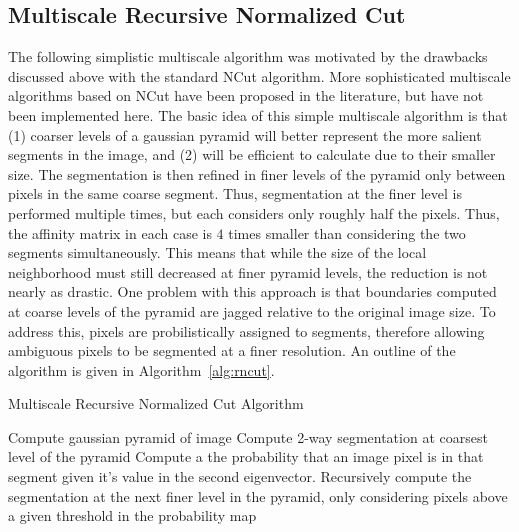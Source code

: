 \documentclass{article}
\begin{document}
\subsection{Multiscale Recursive Normalized Cut}
The following simplistic multiscale algorithm was motivated by the drawbacks discussed above
with the standard NCut algorithm.  More sophisticated multiscale algorithms based on NCut have 
been proposed in the literature, but have not been implemented here\cite{cour}\cite{sharon}\cite{yu}.
The basic idea of this simple multiscale algorithm is that (1) coarser levels of a gaussian 
pyramid will better represent the more salient segments in the image, and (2) will 
be efficient to calculate due to their smaller size.  The segmentation is then refined in
finer levels of the pyramid only between pixels in the same coarse segment.  Thus, segmentation
at the finer level is performed multiple times, but each considers only roughly half the pixels.  
Thus, the affinity matrix in each case is $4$ times smaller than considering the two segments 
simultaneously. This means that while the size of the local neighborhood must still decreased at finer
pyramid levels, the reduction is not nearly as drastic.  
One problem with this approach is that boundaries computed at coarse levels of the pyramid
are jagged relative to the original image size.  To address this, pixels are probilistically
assigned to segments, therefore allowing ambiguous pixels to be segmented at a finer resolution.
An outline of the algorithm is given in Algorithm~\ref{alg:rncut}.
\begin{algorithm}[htb]
	\caption{Multiscale Recursive Normalized Cut Algorithm}
	\label{alg:rncut}
	\begin{algorithmic}[1]
		\STATE Compute gaussian pyramid of image
		\STATE Compute 2-way segmentation at coarsest level of the pyramid
		\STATE Compute a the probability that an image pixel is in that 
		segment given it's value in the second eigenvector.
		\STATE Recursively compute the segmentation at the next finer level
		in the pyramid, only considering pixels above a given threshold
		in the probability map
		\ENDFOR
	\end{algorithmic}
\end{algorithm}
\end{document}
